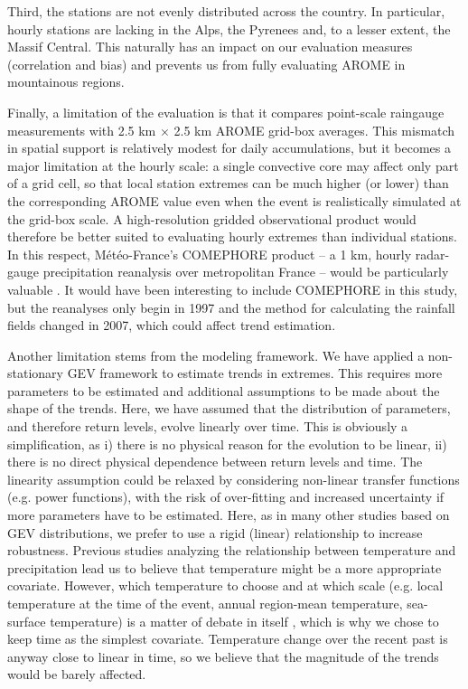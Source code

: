 \documentclass[hess, manuscript]{copernicus}
\begin{document}
Third, the stations are not evenly distributed across the country. In particular, hourly stations are lacking in the Alps, the Pyrenees and, to a lesser extent, the Massif Central. This naturally has an impact on our evaluation measures (correlation and bias) and prevents us from fully evaluating AROME in mountainous regions.

Finally, a limitation of the evaluation is that it compares point-scale raingauge measurements with 2.5 km $\times$ 2.5 km AROME grid-box averages. This mismatch in spatial support is relatively modest for daily accumulations, but it becomes a major limitation at the hourly scale: a single convective core may affect only part of a grid cell, so that local station extremes can be much higher (or lower) than the corresponding AROME value even when the event is realistically simulated at the grid-box scale. A high-resolution gridded observational product would therefore be better suited to evaluating hourly extremes than individual stations. In this respect, Météo-France’s COMEPHORE product -- a 1 km, hourly radar-gauge precipitation reanalysis over metropolitan France -- would be particularly valuable \citep{MeteoFrance_COMEPHORE_dataGouv}. It would have been interesting to include COMEPHORE in this study, but the reanalyses only begin in 1997 and the method for calculating the rainfall fields changed in 2007, which could affect trend estimation.

Another limitation stems from the modeling framework. We have applied a non-stationary GEV framework to estimate trends in extremes. This requires more parameters to be estimated and additional assumptions to be made about the shape of the trends. Here, we have assumed that the distribution of parameters, and therefore return levels, evolve linearly over time. This is obviously a simplification, as i) there is no physical reason for the evolution to be linear, ii) there is no direct physical dependence between return levels and time. The linearity assumption could be relaxed by considering non-linear transfer functions (e.g. power functions), with the risk of over-fitting and increased uncertainty if more parameters have to be estimated. Here, as in many other studies based on GEV distributions, we prefer to use a rigid (linear) relationship to increase robustness. Previous studies analyzing the relationship between temperature and precipitation \citep{DaSilva2025} lead us to believe that temperature might be a more appropriate covariate.
However, which temperature to choose and at which scale (e.g. local temperature at the time of the event, annual region-mean temperature, sea-surface temperature)  is a matter of debate in itself \citep{Schroeer2018, Dash2023, Zeder2020}, which is why we chose to keep time as the simplest covariate. Temperature change over the recent past is anyway close to linear in time, so we believe that the magnitude of the trends would be barely affected.
\end{document}
